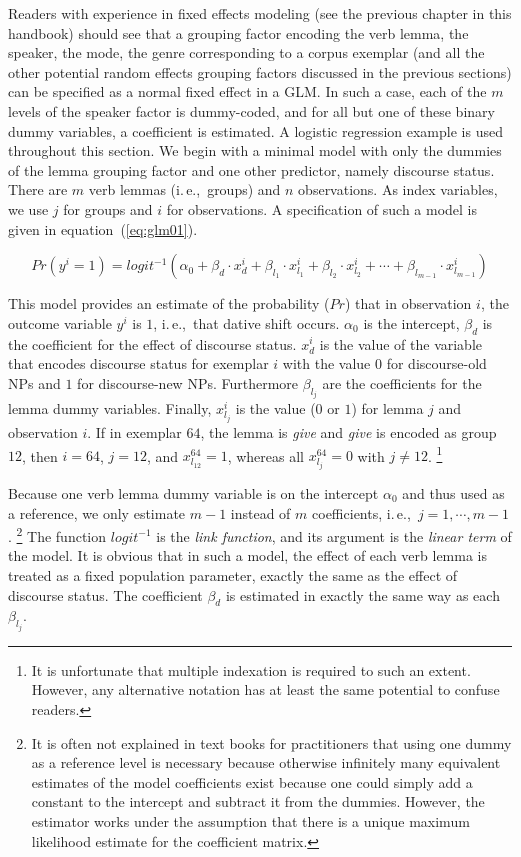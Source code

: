 \documentclass[a4paper,12pt]{article}
\newcommand{\ie}{i.\,e.,\ }
\begin{document}
Readers with experience in fixed effects modeling (see the previous chapter in this handbook) should see that a grouping factor encoding the verb lemma, the speaker, the mode, the genre corresponding to a corpus exemplar (and all the other potential random effects grouping factors discussed in the previous sections) can be specified as a normal fixed effect in a GLM.
In such a case, each of the $m$ levels of the speaker factor is dummy-coded, and for all but one of these binary dummy variables, a coefficient is estimated.
A logistic regression example is used throughout this section.
We begin with a minimal model with only the dummies of the lemma grouping factor and one other predictor, namely discourse status.
There are $m$ verb lemmas (\ie groups) and $n$ observations.
As index variables, we use $j$ for groups and $i$ for observations.
A specification of such a model is given in equation~(\ref{eq:glm01}).

\begin{equation}
  Pr(y^i=1)=logit^{-1}(\alpha_0+\beta_d\cdot x_{d}^i+\beta_{l_1}\cdot x_{l_1}^i+\beta_{l_2}\cdot x_{l_2}^i+\cdots+\beta_{l_{m-1}}\cdot x_{l_{m-1}}^i)
  \label{eq:glm01}
\end{equation}

This model provides an estimate of the probability ($Pr$) that in observation $i$, the outcome variable $y^i$ is $1$, \ie that dative shift occurs.
$\alpha_0$ is the intercept, $\beta_d$ is the coefficient for the effect of discourse status.
$x_d^i$ is the value of the variable that encodes discourse status for exemplar $i$ with the value $0$ for discourse-old NPs and $1$ for discourse-new NPs.
Furthermore $\beta_{l_j}$ are the coefficients for the lemma dummy variables.
Finally, $x_{l_j}^i$ is the value ($0$ or $1$) for lemma $j$ and observation $i$.
If in exemplar $64$, the lemma is \textit{give} and \textit{give} is encoded as group $12$, then $i=64$, $j=12$, and $x_{l_{12}}^{64}=1$, whereas all $x_{l_j}^{64}=0$ with $j\neq12$.%
\footnote{It is unfortunate that multiple indexation is required to such an extent.
However, any alternative notation has at least the same potential to confuse readers.}

Because one verb lemma dummy variable is on the intercept $\alpha_0$ and thus used as a reference, we only estimate $m-1$ instead of $m$ coefficients, \ie $j=1,\cdots,m-1$.%
\footnote{It is often not explained in text books for practitioners that using one dummy as a reference level is necessary because otherwise infinitely many equivalent estimates of the model coefficients exist because one could simply add a constant to the intercept and subtract it from the dummies.
However, the estimator works under the assumption that there is a unique maximum likelihood estimate for the coefficient matrix.}
The function $logit^{-1}$ is the \textit{link function}, and its argument is the \textit{linear term} of the model.
It is obvious that in such a model, the effect of each verb lemma is treated as a fixed population parameter, exactly the same as the effect of discourse status.
The coefficient $\beta_d$ is estimated in exactly the same way as each $\beta_{l_j}$.
\end{document}
